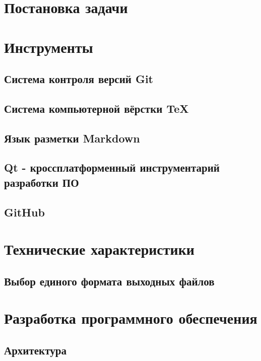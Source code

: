 \section{Постановка задачи}
\setcounter{figure}{0}


\section{Инструменты}
\setcounter{figure}{0}
\subsection{Система контроля версий Git}

\subsection{Система компьютерной вёрстки \TeX}

\subsection{Язык разметки Markdown}
\label{sec:markdown}
\subsection{Qt - кроссплатформенный инструментарий разработки ПО}

\subsection{GitHub}


\section{Технические характеристики}

\subsection{Выбор единого формата выходных файлов}


\clearpage
\section{Разработка программного обеспечения}
\setcounter{figure}{0}
 
\subsection{Архитектура}


